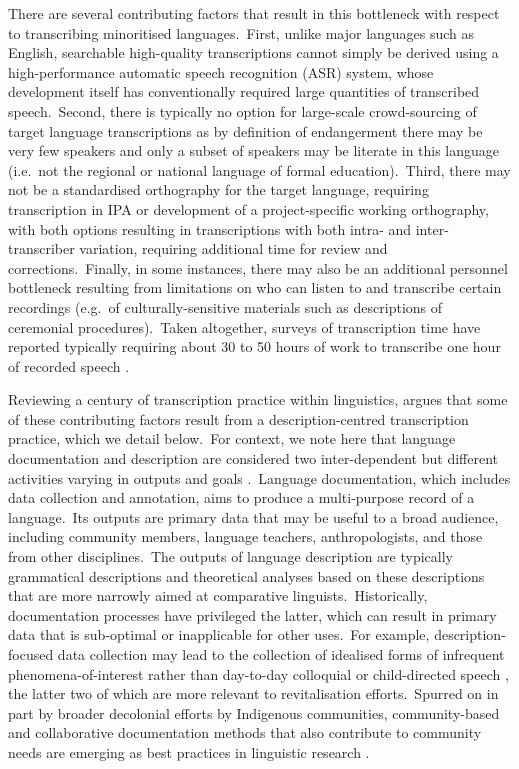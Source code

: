 \documentclass[main.tex]{subfiles}
\begin{document}
There are several contributing factors that result in this bottleneck with respect to transcribing minoritised languages.~First, unlike major languages such as English, searchable high-quality transcriptions cannot simply be derived using a high-performance automatic speech recognition (ASR) system, whose development itself has conventionally required large quantities of transcribed speech.~Second, there is typically no option for large-scale crowd-sourcing of target language transcriptions as by definition of endangerment there may be very few speakers and only a subset of speakers may be literate in this language (i.e.~not the regional or national language of formal education).~Third, there may not be a standardised orthography for the target language, requiring transcription in IPA or development of a project-specific working orthography, with both options resulting in transcriptions with both intra- and inter-transcriber variation, requiring additional time for review and corrections.~Finally, in some instances, there may also be an additional personnel bottleneck resulting from limitations on who can listen to and transcribe certain recordings (e.g.~of culturally-sensitive materials such as descriptions of ceremonial procedures).~Taken altogether, surveys of transcription time have reported typically requiring about 30 to 50 hours of work to transcribe one hour of recorded speech \parencite{durantin2017survey,michaud2014towards,zahrer2020towards}.

Reviewing a century of transcription practice within linguistics, \textcite{bird-2020-sparse} argues that some of these contributing factors result from a description-centred transcription practice, which we detail below.~For context, we note here that language documentation and description are considered two inter-dependent but different activities varying in outputs and goals \parencite{himmelmann1998documentary}.~Language documentation, which includes data collection and annotation, aims to produce a multi-purpose record of a language.~Its outputs are primary data that may be useful to a broad audience, including community members, language teachers, anthropologists, and those from other disciplines.~The outputs of language description are typically grammatical descriptions and theoretical analyses based on these descriptions that are more narrowly aimed at comparative linguists.~Historically, documentation processes have privileged the latter, which can result in primary data that is sub-optimal or inapplicable for other uses.~For example, description-focused data collection may lead to the collection of idealised forms of infrequent phenomena-of-interest rather than day-to-day colloquial or child-directed speech \parencite{rouvier2017language}, the latter two of which are more relevant to revitalisation efforts.~Spurred on in part by broader decolonial efforts by Indigenous communities, community-based and collaborative documentation methods that also contribute to community needs are emerging as best practices in linguistic research \parencite{holton2022indigenous}.
\end{document}
